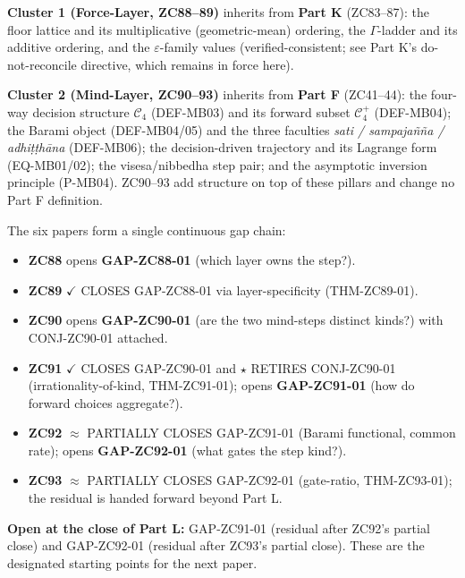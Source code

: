 \documentclass[12pt, a4paper]{article}
\begin{document}
\begin{inheritbox}[title={Backward Inheritance --- Part L}]
\small
\textbf{Cluster 1 (Force-Layer, ZC88--89)} inherits from \textbf{Part K}
(ZC83--87): the floor lattice and its multiplicative (geometric-mean)
ordering, the $\Gamma$-ladder and its additive ordering, and the
$\varepsilon$-family values (verified-consistent; see Part K's
do-not-reconcile directive, which remains in force here).

\medskip
\textbf{Cluster 2 (Mind-Layer, ZC90--93)} inherits from \textbf{Part F}
(ZC41--44): the four-way decision structure $\mathcal{C}_4$ (DEF-MB03) and
its forward subset $\mathcal{C}_4^{+}$ (DEF-MB04); the Barami object
(DEF-MB04/05) and the three faculties \textit{sati / sampaja\~n\~na /
adhi\d{t}\d{t}h\=ana} (DEF-MB06); the decision-driven trajectory and its
Lagrange form (EQ-MB01/02); the visesa/nibbedha step pair; and the
asymptotic inversion principle (P-MB04). ZC90--93 add structure on top of
these pillars and change no Part F definition.
\end{inheritbox}

\begin{correctionbox}[title={Forward Corrections and Internal Gap Chain --- Part L}]
\small
The six papers form a single continuous gap chain:
\begin{itemize}[noitemsep, leftmargin=1.6em]
  \item \textbf{ZC88} opens \textbf{GAP-ZC88-01} (which layer owns the step?).
  \item \textbf{ZC89} \textcolor{crfgreen}{$\checkmark$ CLOSES GAP-ZC88-01}
    via layer-specificity (THM-ZC89-01).
  \item \textbf{ZC90} opens \textbf{GAP-ZC90-01} (are the two mind-steps
    distinct kinds?) with CONJ-ZC90-01 attached.
  \item \textbf{ZC91} \textcolor{crfgreen}{$\checkmark$ CLOSES GAP-ZC90-01}
    and $\star$ RETIRES CONJ-ZC90-01 (irrationality-of-kind, THM-ZC91-01);
    opens \textbf{GAP-ZC91-01} (how do forward choices aggregate?).
  \item \textbf{ZC92} \textcolor{crfgreen}{$\approx$ PARTIALLY CLOSES
    GAP-ZC91-01} (Barami functional, common rate); opens \textbf{GAP-ZC92-01}
    (what gates the step kind?).
  \item \textbf{ZC93} \textcolor{crfgreen}{$\approx$ PARTIALLY CLOSES
    GAP-ZC92-01} (gate-ratio, THM-ZC93-01); the residual is handed forward
    beyond Part L.
\end{itemize}

\medskip
\textbf{Open at the close of Part L:} GAP-ZC91-01 (residual after ZC92's
partial close) and GAP-ZC92-01 (residual after ZC93's partial close). These
are the designated starting points for the next paper.
\end{correctionbox}
\end{document}
